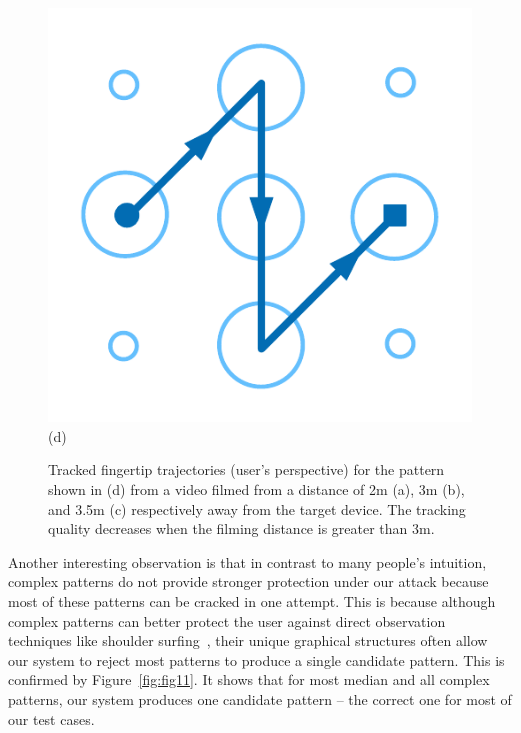 \begin{figure}[!ht]
{\begin{minipage}[b]{0.19\textwidth}
                \includegraphics[width=\textwidth]{fig/distance-pattern.pdf}\\
                \centering  (d)
                \end{minipage}
            }

            \caption{Tracked fingertip trajectories (user's perspective) for the pattern shown in (d) from a video filmed from a distance of 2m (a), 3m (b), and 3.5m (c) respectively away from the target device. The tracking quality decreases when the filming distance is greater than 3m. }
            \label{fig:distance-show}
        \end{figure}

        Another interesting observation is that in contrast to many people's
        intuition, complex patterns do not provide stronger protection under our attack because
        most of these patterns can be cracked in one attempt.
        This is because although complex patterns can better protect the user against direct observation techniques like shoulder surfing~\cite{shoulder}, their unique graphical structures
        often allow our system to reject most patterns to produce a single candidate pattern. This is
        confirmed by Figure~\ref{fig:fig11}. It shows that for most median and all complex patterns, our system produces one candidate pattern --
        the correct one for most of our test cases.


